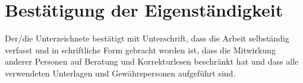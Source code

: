 \chapter{Bestätigung der Eigenständigkeit}
Der/die Unterzeichnete bestätigt mit Unterschrift, dass die Arbeit selbständig verfasst und in schriftliche Form gebracht worden ist, dass die Mitwirkung anderer Personen auf Beratung und Korrekturlesen beschränkt hat und dass alle verwendeten Unterlagen und Gewährspersonen aufgeführt sind.
